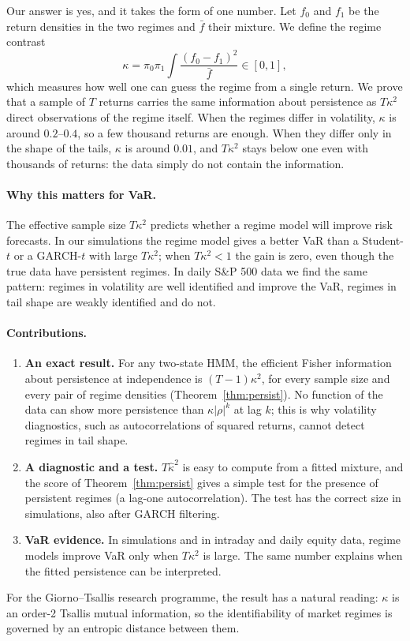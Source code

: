 \documentclass[12pt,letterpaper]{article}
\theoremstyle{plain}
\theoremstyle{remark}
\begin{document}
Our answer is yes, and it takes the form of one number. Let $f_0$ and $f_1$ be the return densities in the two regimes and $\bar f$ their mixture. We define the regime contrast
\[
\kappa=\pi_0\pi_1\int\frac{(f_0-f_1)^2}{\bar f}\in[0,1],
\]
which measures how well one can guess the regime from a single return. We prove that a sample of $T$ returns carries the same information about persistence as $T\kappa^2$ direct observations of the regime itself. When the regimes differ in volatility, $\kappa$ is around $0.2$--$0.4$, so a few thousand returns are enough. When they differ only in the shape of the tails, $\kappa$ is around $0.01$, and $T\kappa^2$ stays below one even with thousands of returns: the data simply do not contain the information.

\paragraph{Why this matters for VaR.} The effective sample size $T\kappa^2$ predicts whether a regime model will improve risk forecasts. In our simulations the regime model gives a better VaR than a Student-$t$ or a GARCH-$t$ with large $T\kappa^2$; when $T\kappa^2<1$ the gain is zero, even though the true data have persistent regimes. In daily S\&P 500 data we find the same pattern: regimes in volatility are well identified and improve the VaR, regimes in tail shape are weakly identified and do not.

\paragraph{Contributions.}
\begin{enumerate}
\item[(i)] \textbf{An exact result.} For any two-state HMM, the efficient Fisher information about persistence at independence is $(T-1)\kappa^2$, for every sample size and every pair of regime densities (Theorem~\ref{thm:persist}). No function of the data can show more persistence than $\kappa|\rho|^k$ at lag $k$; this is why volatility diagnostics, such as autocorrelations of squared returns, cannot detect regimes in tail shape.
\item[(ii)] \textbf{A diagnostic and a test.} $T\hat\kappa^2$ is easy to compute from a fitted mixture, and the score of Theorem~\ref{thm:persist} gives a simple test for the presence of persistent regimes (a lag-one autocorrelation). The test has the correct size in simulations, also after GARCH filtering.
\item[(iii)] \textbf{VaR evidence.} In simulations and in intraday and daily equity data, regime models improve VaR only when $T\kappa^2$ is large. The same number explains when the fitted persistence can be interpreted.
\end{enumerate}
For the Giorno--Tsallis research programme, the result has a natural reading: $\kappa$ is an order-2 Tsallis mutual information, so the identifiability of market regimes is governed by an entropic distance between them.
\end{document}
